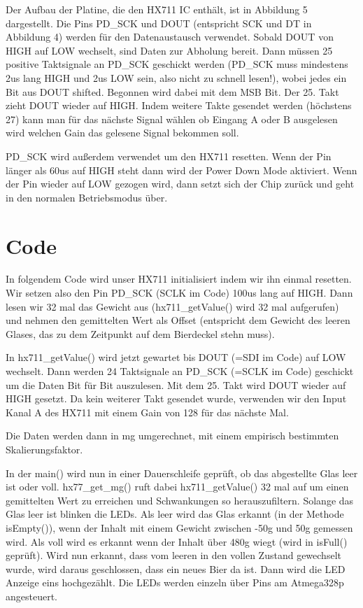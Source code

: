 \documentclass[12pt,journal,compsoc]{IEEEtran}
\begin{document}
Der Aufbau der Platine, die den  HX711 IC enthält, ist in Abbildung 5 dargestellt.
Die Pins PD\_SCK und DOUT (entspricht SCK und DT in Abbildung 4) werden für den Datenaustausch
verwendet. Sobald DOUT von HIGH auf LOW wechselt, sind Daten zur Abholung bereit.
Dann müssen 25 positive Taktsignale an PD\_SCK geschickt werden (PD\_SCK muss mindestens 2us lang
HIGH und 2us LOW sein, also nicht zu schnell lesen!), wobei jedes ein Bit aus DOUT shifted.
Begonnen wird dabei mit dem MSB Bit. Der 25. Takt zieht DOUT wieder auf HIGH.
Indem weitere Takte gesendet werden (höchstens 27) kann man für das nächste Signal wählen
ob Eingang A oder B ausgelesen wird welchen Gain das gelesene Signal bekommen soll. 

PD\_SCK wird außerdem verwendet um den HX711 resetten. Wenn der Pin länger als 60us auf HIGH
steht dann wird der Power Down Mode aktiviert. Wenn der Pin wieder auf LOW gezogen wird,
dann setzt sich der Chip zurück und geht in den normalen Betriebsmodus über.

\section{Code}

In folgendem Code wird unser HX711 initialisiert indem wir ihn einmal resetten.
Wir setzen also den Pin PD\_SCK (SCLK im Code) 100us lang auf HIGH. Dann lesen wir 32 mal das
Gewicht aus (hx711\_getValue() wird 32 mal aufgerufen) und nehmen den gemittelten Wert als
Offset (entspricht dem Gewicht des leeren Glases,
das zu dem Zeitpunkt auf dem Bierdeckel stehn muss).



In hx711\_getValue() wird jetzt gewartet bis DOUT (=SDI im Code) auf LOW wechselt.
Dann werden 24 Taktsignale an PD\_SCK (=SCLK im Code) geschickt um die Daten Bit für Bit auszulesen.
Mit dem 25. Takt wird DOUT wieder auf HIGH gesetzt. Da kein weiterer Takt gesendet wurde,
verwenden wir den Input Kanal A des HX711 mit einem Gain von 128 für das nächste Mal.



Die Daten werden dann in mg umgerechnet, mit einem empirisch bestimmten Skalierungsfaktor.



In der main() wird nun in einer Dauerschleife geprüft, ob das abgestellte Glas leer ist oder voll.
hx77\_get\_mg() ruft dabei hx711\_getValue() 32 mal auf um einen gemittelten Wert zu erreichen
und Schwankungen so herauszufiltern. Solange das Glas leer ist blinken die LEDs. Als leer wird das
Glas erkannt (in der Methode isEmpty()), wenn der Inhalt mit einem Gewicht zwischen -50g und 50g gemessen wird.
Als voll wird es erkannt wenn der Inhalt über 480g wiegt (wird in isFull() geprüft). Wird nun erkannt,
dass vom leeren in den vollen Zustand gewechselt wurde, wird daraus geschlossen, dass ein
neues Bier da ist. Dann wird die LED Anzeige eins hochgezählt. Die LEDs werden einzeln über Pins
am Atmega328p angesteuert.
\end{document}
